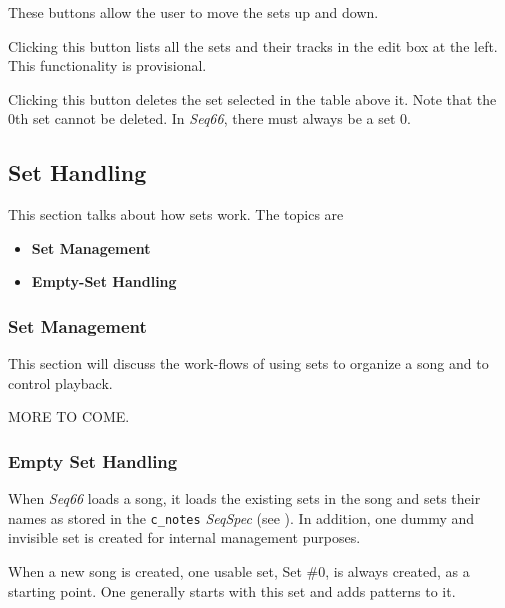    These buttons allow the user to move the sets up and down.

   Clicking this button lists all the sets and their tracks in the edit box at
   the left. This functionality is provisional.

   Clicking this button deletes the set selected in the table above it.
   Note that the 0th set cannot be deleted.
   In \textsl{Seq66}, there must always be a set 0.

\subsection{Set Handling}
\label{subsec:setmaster_handling}

   This section talks about how sets work.  The topics are

   \begin{itemize}
      \item \textbf{Set Management}
      \item \textbf{Empty-Set Handling}
   \end{itemize}

\subsubsection{Set Management}
\label{subsubsec:setmaster_management}

   This section will discuss the work-flows of using sets to organize a song
   and to control playback.

   MORE TO COME.

\subsubsection{Empty Set Handling}
\label{subsubsec:setmaster_empty_sets}

   When \textsl{Seq66} loads a song, it loads the existing sets in the song and
   sets their names as stored in the \texttt{c\_notes} \textsl{SeqSpec}
   (see ).
   In addition, one dummy and invisible set is created for internal management
   purposes.

   When a new song is created, one usable set, Set \#0, is always created, as a
   starting point.  One generally starts with this set and adds patterns to it.

